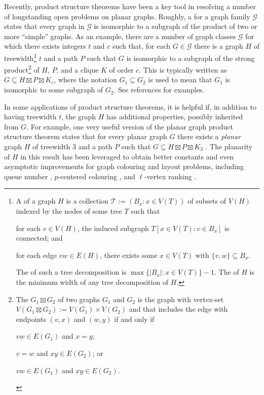 \documentclass{patmorin}
\newcommand\subsetcong{\mathrel{\text{%
    \setbox0\hbox{$\subseteq$}%
    \rlap{\hbox to \wd0{\hss\hss\hss\raisebox{1.5\height}{$\sim$}\hss}}\box0
}}}
\renewcommand{\subsetcong}{\subseteq}
\begin{document}
Recently, product structure theorems have been a key tool in resolving a number of longstanding open problems on planar graphs.  Roughly, a  for a graph family $\mathcal{G}$ states that every graph in $\mathcal{G}$ is isomorphic to a subgraph of the product of two or more ``simple'' graphs.  As an example, there are a number of graph classes $\mathcal{G}$ for which there exists integers $t$ and $c$ such that, for each $G\in\mathcal{G}$ there is a graph $H$ of treewidth\footnote{A  of a graph $H$ is a collection $\mathcal{T}:=(B_x:x\in V(T))$ of subsets of $V(H)$ indexed by the nodes of some tree $T$ such that
\begin{inparaenum}[(i)]
  \item for each $v\in V(H)$, the induced subgraph $T[x\in V(T):v\in B_x]$ is connected; and
  \item for each edge $vw\in E(H)$, there exists some $x\in V(T)$ with $\{v,w\}\subsetcong B_x$.
\end{inparaenum}
The  of such a tree decomposition is $\max\{|B_x|:x\in V(T)\}-1$. The  of $H$ is the minimum width of any tree decomposition of $H$.} $t$ and a path $P$ such that $G$ is isomorphic to a subgraph of the strong product\footnote{The  $G_1\boxtimes G_2$ of two graphs $G_1$ and $G_2$ is the graph with vertex-set $V(G_1\boxtimes G_2):=V(G_1)\times V(G_2)$ and that includes the edge with endpoints $(v,x)$ and $(w,y)$ if and only if
\begin{inparaenum}[(i)]
  \item $vw\in E(G_1)$ and $x=y$;
  \item $v=w$ and $xy\in E(G_2)$; or
  \item $vw\in E(G_1)$ and $xy\in E(G_2)$.
\end{inparaenum}
} of $H$, $P$, and a clique $K$ of order $c$.
This is typically written as $G\subsetcong H\boxtimes P\boxtimes K_c$, where the notation $G_1\subsetcong G_2$ is used to mean that $G_1$ is isomorphic to some subgraph of $G_2$.  See references \cite{dujmovic.joret.ea:planar,dujmovic.morin.ea:structure,krauthgamer.lee:intrinsic,ueckerdt.wood.ea:improved,bose.morin.ea:optimal,campbell.clinch.ea:product,illingworth.scott.ea:alon,distel.hickingbotham.ea:improved,hickingbotham.jungeblut.ea:product,hickingbotham.wood:shallow,wood:product} for examples.

In some applications of product structure theorems, it is helpful if, in addition to having treewidth $t$, the graph $H$ has additional properties, possibly inherited from $G$.  For example, one very useful version of the planar graph product structure theorem states that for every planar graph $G$ there exists a \emph{planar} graph $H$ of treewidth $3$ and a path $P$ such that $G\subsetcong H\boxtimes P\boxtimes K_3$ \cite[Theorem~36(b)]{dujmovic.joret.ea:planar}.  The planarity of $H$ in this result has been leveraged to obtain better constants and even asymptotic improvements for graph colouring and layout problems, including queue number \cite{dujmovic.joret.ea:planar}, $p$-centered colouring \cite{debski.felsner.ea:improved}, and $\ell$-vertex ranking \cite{bose.dujmovic.ea:asymptotically}.
\end{document}
